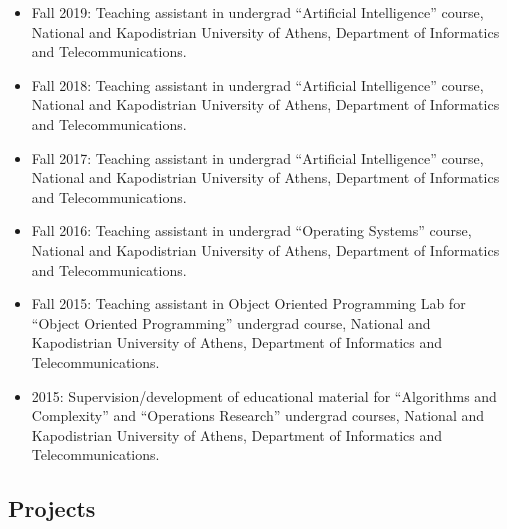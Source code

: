 \documentclass[a4paper,oneside,11pt]{article}
\begin{document}
\begin{itemize}

\item Fall 2019: Teaching assistant in undergrad ``Artificial Intelligence'' course, National and Kapodistrian University of Athens, Department of Informatics and Telecommunications.

\item Fall 2018: Teaching assistant in undergrad ``Artificial Intelligence'' course, National and Kapodistrian University of Athens, Department of Informatics and Telecommunications.

\item Fall 2017: Teaching assistant in undergrad ``Artificial Intelligence'' course, National and Kapodistrian University of Athens, Department of Informatics and Telecommunications.

\item Fall 2016: Teaching assistant in undergrad ``Operating Systems'' course, National and Kapodistrian University of Athens, Department of Informatics and Telecommunications.

\item Fall 2015: Teaching assistant in Object Oriented Programming Lab for ``Object Oriented Programming'' undergrad course, National and Kapodistrian University of Athens, Department of Informatics and Telecommunications.

\item 2015: Supervision/development of educational material for ``Algorithms and Complexity'' and ``Operations Research'' undergrad courses, National and Kapodistrian University of Athens, Department of Informatics and Telecommunications.

\end{itemize}

\subsection*{Projects}
\end{document}

